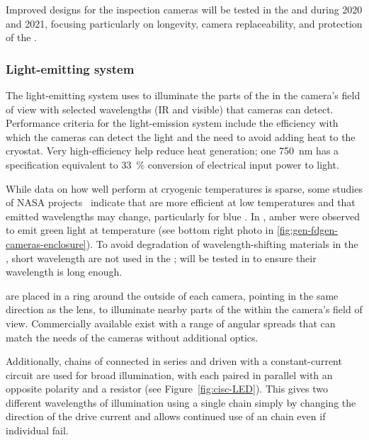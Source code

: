 Improved designs for the inspection cameras will be tested in the  and  during 2020 and 2021, focusing particularly on longevity, camera replaceability, and protection of the .

\subsubsection{Light-emitting system}
The light-emitting system uses  to illuminate
the parts of the %
 in the camera's field of view with selected
wavelengths (IR and visible) that cameras can detect.  Performance criteria for the light-emission system include the efficiency with which the cameras can detect the light and the need to avoid
adding heat to the cryostat. Very high-efficiency
help reduce heat generation; one \SI{750}{nm}  \cite{lumileds-DS144-pdf}
has a specification equivalent to
\SI{33}{\%} conversion of electrical input power to light.

While data on how well  perform at cryogenic temperatures
is sparse, some studies of NASA projects~\cite{Carron:2017zzz}
indicate that  are more efficient at low temperatures and
that emitted wavelengths may change, particularly for blue
.  In , amber  were observed  to
emit green light at  temperature (see bottom right photo
in \ref{fig:gen-fdgen-cameras-enclosure}).  To avoid degradation of
wavelength-shifting materials in the , short wavelength
 are not used in the ;  will be tested
in  to ensure their wavelength is long enough.


 are placed in a ring around the outside of each
camera, pointing in the same direction as the lens, to 
illuminate nearby parts of the  within the camera's field of
view. Commercially available  exist with
a range of angular spreads that can match the needs of the
cameras without additional optics.

Additionally, chains of  connected in series and driven with a
constant-current circuit are used for broad illumination, with each
 paired in parallel with an opposite polarity  and a resistor
(see Figure~\ref{fig:cisc-LED}).
This gives two different wavelengths of illumination using a single chain simply by changing the direction of the drive current and allows continued use of an  chain even if individual  fail.

